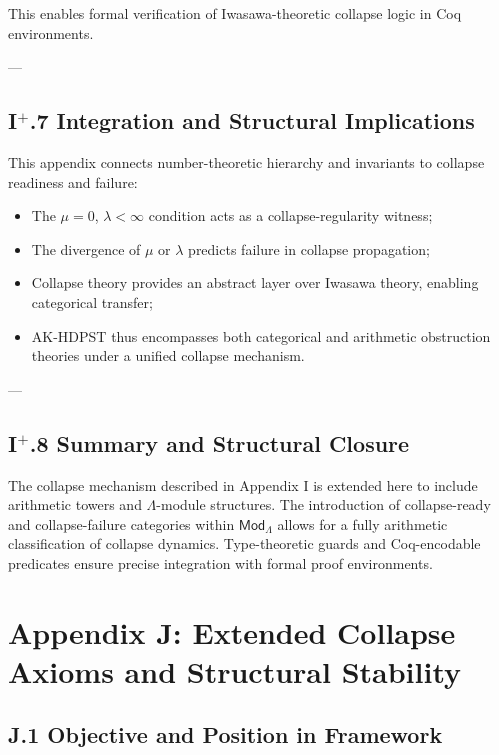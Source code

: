 \documentclass[11pt]{article}
\begin{document}
This enables formal verification of Iwasawa-theoretic collapse logic in Coq environments.

---

\subsection*{I$^{+}$.7 Integration and Structural Implications}

This appendix connects number-theoretic hierarchy and invariants to collapse readiness and failure:

\begin{itemize}
    \item The $\mu = 0$, $\lambda < \infty$ condition acts as a collapse-regularity witness;
    \item The divergence of $\mu$ or $\lambda$ predicts failure in collapse propagation;
    \item Collapse theory provides an abstract layer over Iwasawa theory, enabling categorical transfer;
    \item AK-HDPST thus encompasses both categorical and arithmetic obstruction theories under a unified collapse mechanism.
\end{itemize}

---

\subsection*{I$^{+}$.8 Summary and Structural Closure}

The collapse mechanism described in Appendix I is extended here to include arithmetic towers and $\Lambda$-module structures. The introduction of collapse-ready and collapse-failure categories within $\mathsf{Mod}_\Lambda$ allows for a fully arithmetic classification of collapse dynamics. Type-theoretic guards and Coq-encodable predicates ensure precise integration with formal proof environments.



\section*{Appendix J: Extended Collapse Axioms and Structural Stability}

\subsection*{J.1 Objective and Position in Framework}
\end{document}
